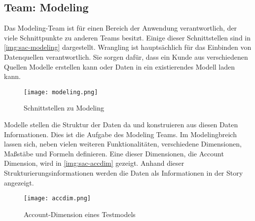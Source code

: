 \subsection{Team: Modeling}
Das Modeling-Team ist für einen Bereich der Anwendung verantwortlich, der viele Schnittpunkte zu anderen Teams besitzt.
Einige dieser Schnittstellen sind in \autoref{img:sac-modeling} dargestellt. Wrangling ist hauptsächlich für das 
Einbinden von Datenquellen verantwortlich. Sie sorgen dafür, dass ein Kunde aus verschiedenen Quellen Modelle erstellen kann oder Daten in 
ein existierendes Modell laden kann. 
\begin{figure}[ht]
	\centering
	\texttt{[image: modeling.png]}
	\caption{Schnittstellen zu Modeling}
	\label{img:sac-modeling}
\end{figure}

Modelle stellen die Struktur der Daten da und konstruieren aus diesen Daten Informationen. Dies ist die Aufgabe des Modeling Teams.
Im Modelingbreich lassen sich, neben vielen weiteren Funktionalitäten, verschiedene Dimensionen, Maßstäbe und Formeln definieren.
Eine dieser Dimensionen, die Account Dimension, wird in \autoref{img:sac-accdim} gezeigt. 
Anhand dieser Strukturierungsinformationen werden die Daten als Informationen in der Story angezeigt.
\begin{figure}[ht]
	\centering
	\texttt{[image: accdim.png]}
	\caption{Account-Dimension eines Testmodels}
	\label{img:sac-accdim}
\end{figure}



